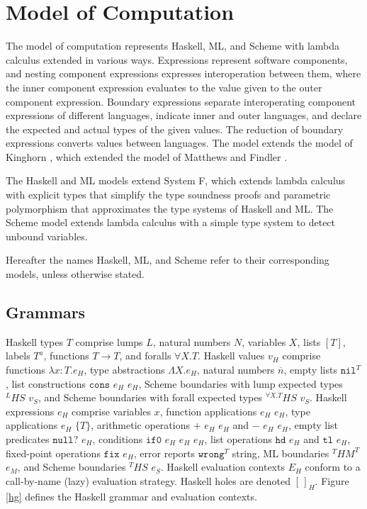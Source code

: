 \chapter{Model of Computation}

The model of computation represents Haskell, ML, and Scheme with lambda calculus extended in various ways.  Expressions represent software components, and nesting component expressions expresses interoperation between them, where the inner component expression evaluates to the value given to the outer component expression.  Boundary expressions separate interoperating component expressions of different languages, indicate inner and outer languages, and declare the expected and actual types of the given values.  The reduction of boundary expressions converts values between languages.  The model extends the model of Kinghorn \cite{kinghorn07}, which extended the model of Matthews and Findler \cite{matthews07}.

The Haskell and ML models extend System F, which extends lambda calculus with explicit types that simplify the type soundness proofs and parametric polymorphism that approximates the type systems of Haskell and ML.  The Scheme model extends lambda calculus with a simple type system to detect unbound variables.

Hereafter the names Haskell, ML, and Scheme refer to their corresponding models, unless otherwise stated.

\section{Grammars}

Haskell types $T$ comprise lumps $L$, natural numbers $N$, variables $X$, lists $[T]$, labels $T^{a}$, functions $T\rightarrow T$, and foralls $\forall X.T$.  Haskell values $v_{H}$ comprise functions $\lambda x:T.e_{H}$, type abstractions $\Lambda X.e_{H}$, natural numbers $\overline{n}$, empty lists $\mathtt{nil}^{T}$, list constructions $\mathtt{cons}$ $e_{H}$ $e_{H}$, Scheme boundaries with lump expected types $^{L}HS$ $v_{S}$, and Scheme boundaries with forall expected types $^{\forall X.T}HS$ $v_{S}$.  Haskell expressions $e_{H}$ comprise variables $x$, function applications $e_{H}$ $e_{H}$, type applications $e_{H}$ $\lbrace T\rbrace$, arithmetic operations $+$ $e_{H}$ $e_{H}$ and $-$ $e_{H}$ $e_{H}$, empty list predicates $\mathtt{null?}$ $e_{H}$, conditions $\mathtt{if0}$ $e_{H}$ $e_{H}$ $e_{H}$, list operations $\mathtt{hd}$ $e_{H}$ and $\mathtt{tl}$ $e_{H}$, fixed-point operations $\mathtt{fix}$ $e_{H}$, error reports $\mathtt{wrong}^{T}$ string, ML boundaries $^{T}HM^{T}$ $e_{M}$, and Scheme boundaries $^{T}HS$ $e_{S}$.  Haskell evaluation contexts $E_{H}$ conform to a call-by-name (lazy) evaluation strategy.  Haskell holes are denoted $[\,]_{H}$.  Figure \ref{hg} defines the Haskell grammar and evaluation contexts.

